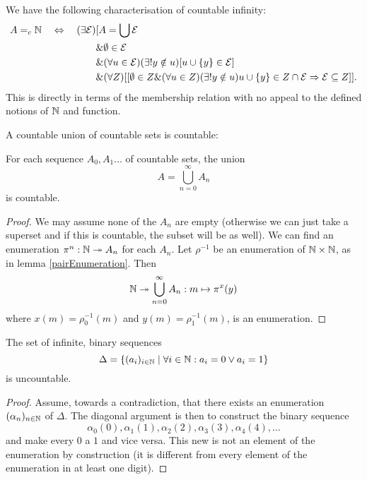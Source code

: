 \begin{lemma}
We have the following characterisation of countable infinity:
\begin{align*}
A =_c \mathbb{N} \quad \Leftrightarrow \quad (\exists \mathcal{E})&[A = \bigcup \mathcal{E} \\
&\& \emptyset \in \mathcal{E} \\
&\& (\forall u\in \mathcal{E})(\exists ! y \notin u)[u\cup \{ y \}\in \mathcal{E}] \\
&\& (\forall Z)[[\emptyset \in Z \& (\forall u \in Z)(\exists ! y \notin u)u\cup \{y\} \in Z \cap \mathcal{E} \Rightarrow \mathcal{E}\subseteq Z]].
\end{align*}
This is directly in terms of the membership relation with no appeal to the defined notions of $\mathbb{N}$ and function.
\end{lemma}

\begin{proposition}[Cantor]
A countable union of countable sets is countable:

For each sequence $A_0, A_1 \ldots$ of countable sets, the union
\[ A = \bigcup_{n=0}^\infty A_n \]
is countable.
\end{proposition}
\begin{proof}
We may assume none of the $A_n$ are empty (otherwise we can just take a superset and if this is countable, the subset will be as well). We can find an enumeration $\pi^n: \mathbb{N}\twoheadrightarrow A_n$ for each $A_n$. Let $\rho^{-1}$ be an enumeration of $\mathbb{N}\times\mathbb{N}$, as in lemma \ref{pairEnumeration}. Then
\[ \mathbb{N} \twoheadrightarrow  \bigcup_{n=0}^\infty A_n: m\mapsto \pi^{x}(y) \]
where $x(m) = \rho^{-1}_0(m)$ and $y(m) = \rho^{-1}_1(m)$, is an enumeration.
\end{proof}

\begin{proposition}
The set of infinite, binary sequences
\[ \Delta = \{ (a_i)_{i\in\mathbb{N}} \;|\; \forall i\in\mathbb{N}: a_i=0\lor a_i=1 \} \]
is uncountable.
\end{proposition}
\begin{proof}
Assume, towards a contradiction, that there exists an enumeration $(\alpha_n)_{n\in\mathbb{N}}$ of $\Delta$. The diagonal argument is then to construct the binary sequence
\[ \alpha_0(0),\alpha_1(1), \alpha_2(2), \alpha_3(3), \alpha_4(4),\ldots  \]
and make every $0$ a $1$ and vice versa. This new is not an element of the enumeration by construction (it is different from every element of the enumeration in at least one digit).
\end{proof}

